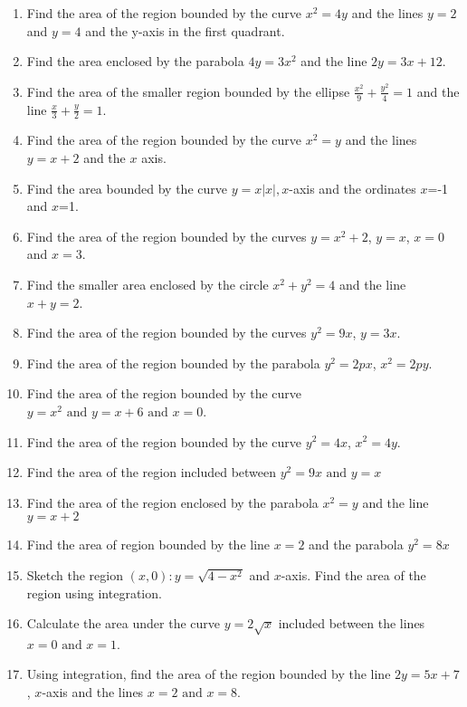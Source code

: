 \begin{enumerate}[label=\thesubsection.\arabic*,ref=\thesubsection.\theenumi]
\label{chapters/12/8/1/13}
\item 
Find the area of the region bounded by the curve $x^2=4y$ and the lines $y=2$ and $y=4$ and the y-axis in the first quadrant.
\item 
	Find the area enclosed by the parabola $4y=3x^2 $ and the line $2y=3x+12$.
\item 
	Find the area of the smaller region bounded by the ellipse $\frac{x^2}{9}+\frac{y^2}{4}=1$
and the line $\frac{x}{3}+\frac{y}{2}=1$.\\
\solution
\label{chapters/12/8/3/8}

\item 
Find the area of the region bounded by the curve $x^2=y$ and the lines $y=x+2$ and the $x$ axis.
\label{chapters/12/8/3/10}
\item 
Find   the area bounded by the curve $y=x|x|, x$-axis and the ordinates $x$=-1 and $x$=1.
\label{chapters/12/8/3/17}
\item 
	Find the area of the region bounded by the curves $y=x^2+2$, $y=x$, $x=0$ and $x=3. $
\label{chapters/12/8/2/3}
\item 
Find the smaller area enclosed by the circle $x^2 + y^2 = 4$ and the line $x + y = 2$. 
\item Find the area of the region bounded by the curves $y^2 = 9x$, $y = 3x$.
\item Find the area of the region bounded by the parabola $y^2 = 2px$, $x^2 = 2py$.
\item Find the area of the region bounded by the curve $y = x^2\text{ and }y = x + 6\text{ and }x = 0$.
\item Find the area of the region bounded by the curve $y^2 = 4x$, $x^2 = 4y$.
\item Find the area of the region included between $y^2 = 9x\text{ and }y =x$
\item Find the area of the region enclosed by the parabola $x^2 = y$ and the line $y = x + 2$
\item Find the area of region bounded by the line $x = 2$ and the parabola $y^2 = 8x$
\item Sketch the region ${(x,0) : y = \sqrt{4 - x^2}}$ and $x$-axis. Find the area of the region using integration.
\item Calculate the area under the curve $y = 2\sqrt{x}$ included between the lines $x = 0\text{ and }x = 1$.
\item Using integration, find the area of the region bounded by the line $2y = 5x + 7$, $x$-axis and the lines $x = 2\text{ and }x =8$.

\end{enumerate}
